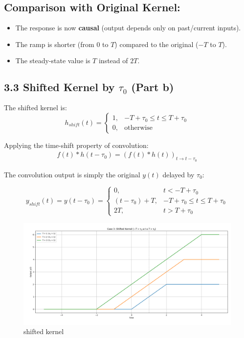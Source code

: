 \subsection*{Comparison with Original Kernel:}
\begin{itemize}
    \item The response is now \textbf{causal} (output depends only on past/current inputs).
    \item The ramp is shorter (from \( 0 \) to \( T \)) compared to the original (\( -T \) to \( T \)).
    \item The steady-state value is \( T \) instead of \( 2T \).
\end{itemize}

\subsection*{3.3 Shifted Kernel by \( \tau_0 \) (Part b)}

The shifted kernel is:
\begin{equation}
h_{shift}(t) = 
\begin{cases} 
1, & -T + \tau_0 \leq t \leq T + \tau_0 \\
0, & \text{otherwise}
\end{cases}
\end{equation}

Applying the time-shift property of convolution:
\begin{align}
f(t) * h(t-\tau_0) = (f(t) * h(t))_{t \rightarrow t-\tau_0}
\end{align}

The convolution output is simply the original \( y(t) \) delayed by \( \tau_0 \):

\begin{equation}
y_{shift}(t) = y(t - \tau_0) = 
\begin{cases} 
0, & t < -T + \tau_0 \\
(t - \tau_0) + T, & -T + \tau_0 \leq t \leq T + \tau_0 \\
2T, & t > T + \tau_0 
\end{cases}
\end{equation}
\begin{figure}[H]
    \centering
    \includegraphics[width=0.8\linewidth]{plotsstep/case3step.png}
    \caption{shifted kernel}
    \label{fig:enter-label}
\end{figure}
